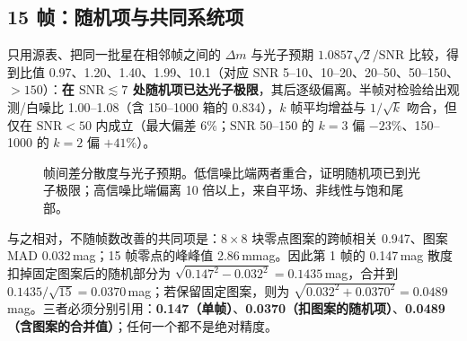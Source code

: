 \documentclass[11pt,a4paper]{ctexart}
\begin{document}
\subsection{15 帧：随机项与共同系统项}\label{sec:frames}
只用源表、把同一批星在相邻帧之间的 $\Delta m$ 与光子预期 $1.0857\sqrt2/\mathrm{SNR}$ 比较，得到比值 0.97、1.20、1.40、1.99、10.1（对应 $\mathrm{SNR}$ 5--10、10--20、20--50、50--150、$>150$）：\textbf{在 $\mathrm{SNR}\lesssim7$ 处随机项已达光子极限}，其后逐级偏离。半帧对检验给出观测/白噪比 1.00--1.08（含 150--1000 箱的 0.834），$k$ 帧平均增益与 $1/\sqrt k$ 吻合，但仅在 $\mathrm{SNR}<50$ 内成立（最大偏差 6\%；$\mathrm{SNR}$ 50--150 的 $k=3$ 偏 $-23\%$、150--1000 的 $k=2$ 偏 $+41\%$）。

\begin{figure}[htbp]\centering
{}
\caption{帧间差分散度与光子预期。低信噪比端两者重合，证明随机项已到光子极限；高信噪比端偏离 10 倍以上，来自平场、非线性与饱和尾部。}
\label{fig:delta}
\end{figure}

\noindent 与之相对，不随帧数改善的共同项是：$8\times8$ 块零点图案的跨帧相关 0.947、图案 MAD 0.032\,mag；15 帧零点的峰峰值 2.86\,mmag。因此第 1 帧的 0.147\,mag 散度扣掉固定图案后的随机部分为 $\sqrt{0.147^2-0.032^2}=0.1435$\,mag，合并到 $0.1435/\sqrt{15}=0.0370$\,mag；若保留固定图案，则为 $\sqrt{0.032^2+0.0370^2}=0.0489$\,mag。三者必须分别引用：\textbf{0.147（单帧）}、\textbf{0.0370（扣图案的随机项）}、\textbf{0.0489（含图案的合并值）}；任何一个都不是绝对精度。
\end{document}
